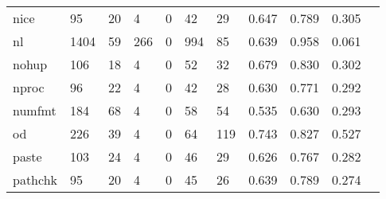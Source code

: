 \begin{longtable}{lp{1.10cm}p{1.10cm}p{1.10cm}p{1.10cm}p{1.10cm}p{1.10cm}p{1.10cm}p{1.10cm}p{1.10cm}p{1.10cm}}
nice      &                     95 &                                 20 &                                 4 &                                0 &                                42 &                              29 &                          0.647 &                                 0.789 &                               0.305 \\
nl        &                   1404 &                                 59 &                               266 &                                0 &                               994 &                              85 &                          0.639 &                                 0.958 &                               0.061 \\
nohup     &                    106 &                                 18 &                                 4 &                                0 &                                52 &                              32 &                          0.679 &                                 0.830 &                               0.302 \\
nproc     &                     96 &                                 22 &                                 4 &                                0 &                                42 &                              28 &                          0.630 &                                 0.771 &                               0.292 \\
numfmt    &                    184 &                                 68 &                                 4 &                                0 &                                58 &                              54 &                          0.535 &                                 0.630 &                               0.293 \\
od        &                    226 &                                 39 &                                 4 &                                0 &                                64 &                             119 &                          0.743 &                                 0.827 &                               0.527 \\
paste     &                    103 &                                 24 &                                 4 &                                0 &                                46 &                              29 &                          0.626 &                                 0.767 &                               0.282 \\
pathchk   &                     95 &                                 20 &                                 4 &                                0 &                                45 &                              26 &                          0.639 &                                 0.789 &                               0.274 \\

\end{longtable}
